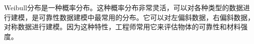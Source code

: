
Weibull分布是一种概率分布。这种概率分布非常灵活，可以对各种类型的数据进行建模，是可靠性数据建模中最常用的分布。它可以对左偏斜数据，右偏斜数据，对称数据进行建模。因为这种特性，工程师常用它来评估物体的可靠性和材料强度。